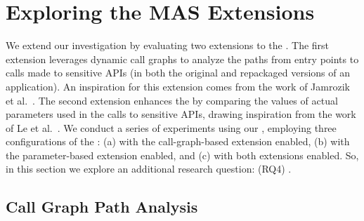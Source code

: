 \section{Exploring the MAS Extensions}\label{sec:complementary}



We extend our investigation by evaluating two extensions to the \mas. The first extension leverages dynamic call graphs
to analyze the paths from entry points to calls made to sensitive APIs (in both the original and repackaged versions of an application).
An inspiration for this extension comes from the work of Jamrozik et al.~\cite{DBLP:conf/icse/JamrozikSZ16}.
The second extension enhances the \mas by comparing the values of actual parameters used in the calls to sensitive APIs,
drawing inspiration from the work of Le et al.~\cite{le2018towards}. We conduct a series of experiments using our \cds,
employing three configurations of the \mas: (a) with the call-graph-based extension enabled,
(b) with the parameter-based extension enabled, and (c) with both extensions enabled.
So, in this section we explore an additional research question: (RQ4) \rqe.

\subsection{Call Graph Path Analysis}

